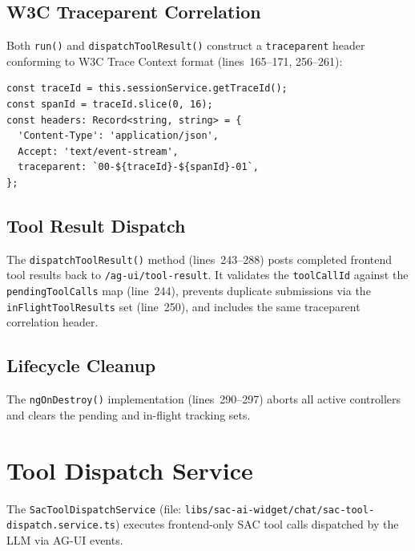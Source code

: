 \documentclass[11pt]{article}
\begin{document}
\subsection{W3C Traceparent Correlation}

Both \texttt{run()} and \texttt{dispatchToolResult()} construct a
\texttt{traceparent} header conforming to W3C Trace Context format
(lines~165--171, 256--261):

\begin{lstlisting}[language={[Sharp]C},caption={Traceparent construction (sac-ag-ui.service.ts:165--171)}]
const traceId = this.sessionService.getTraceId();
const spanId = traceId.slice(0, 16);
const headers: Record<string, string> = {
  'Content-Type': 'application/json',
  Accept: 'text/event-stream',
  traceparent: `00-${traceId}-${spanId}-01`,
};
\end{lstlisting}

\subsection{Tool Result Dispatch}

The \texttt{dispatchToolResult()} method (lines~243--288) posts completed
frontend tool results back to \texttt{/ag-ui/tool-result}. It validates the
\texttt{toolCallId} against the \texttt{pendingToolCalls} map (line~244),
prevents duplicate submissions via the \texttt{inFlightToolResults} set
(line~250), and includes the same traceparent correlation header.

\subsection{Lifecycle Cleanup}

The \texttt{ngOnDestroy()} implementation (lines~290--297) aborts all active
controllers and clears the pending and in-flight tracking sets.

\section{Tool Dispatch Service}
\label{sec:tools}

The \texttt{SacToolDispatchService} (file:
\texttt{libs/sac-ai-widget/chat/sac-tool-dispatch.service.ts}) executes
frontend-only SAC tool calls dispatched by the LLM via AG-UI events.
\end{document}
